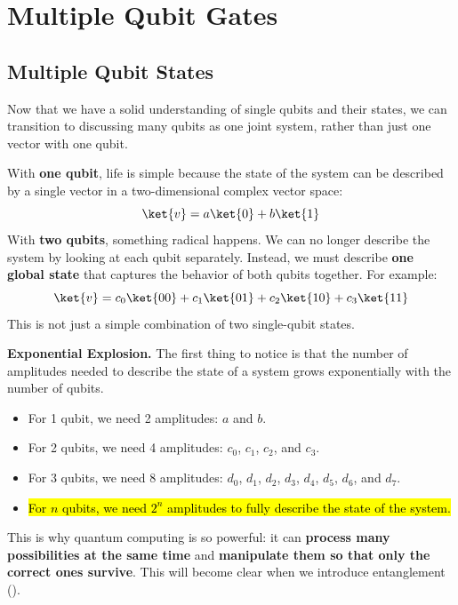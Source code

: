 \section{Multiple Qubit Gates}\label{sec:multiple-qubit-gates}

\subsection{Multiple Qubit States}\label{sec:multiple-qubit-states}

Now that we have a solid understanding of single qubits and their states, we can transition to discussing many qubits as one joint system, rather than just one vector with one qubit.

\highspace
With \textbf{one qubit}, life is simple because the state of the system can be described by a single vector in a two-dimensional complex vector space:
\begin{equation*}
    \ket{v} = a \ket{0} + b \ket{1}
\end{equation*}
With \textbf{two qubits}, something radical happens. We can no longer describe the system by looking at each qubit separately. Instead, we must describe \textbf{one global state} that captures the behavior of both qubits together. For example:
\begin{equation*}
    \ket{v} = c_{0} \ket{00} + c_{1} \ket{01} + c_{2} \ket{10} + c_{3} \ket{11}
\end{equation*}
This is not just a simple combination of two single-qubit states.

\label{subsubsec:exponential-explosion}\highspace
\textcolor{Red2}{ \textbf{Exponential Explosion.}} The first thing to notice is that the number of amplitudes needed to describe the state of a system grows exponentially with the number of qubits.
\begin{itemize}
    \item For 1 qubit, we need 2 amplitudes: $a$ and $b$.
    \item For 2 qubits, we need 4 amplitudes: $c_{0}$, $c_{1}$, $c_{2}$, and $c_{3}$.
    \item For 3 qubits, we need 8 amplitudes: $d_{0}$, $d_{1}$, $d_{2}$, $d_{3}$, $d_{4}$, $d_{5}$, $d_{6}$, and $d_{7}$.
    \item \hl{For $n$ qubits, we need $2^{n}$ amplitudes to fully describe the state of the system.}
\end{itemize}
This is why quantum computing is so powerful: it can \textbf{process many possibilities at the same time} and \textbf{manipulate them so that only the correct ones survive}. This will become clear when we introduce entanglement ().

